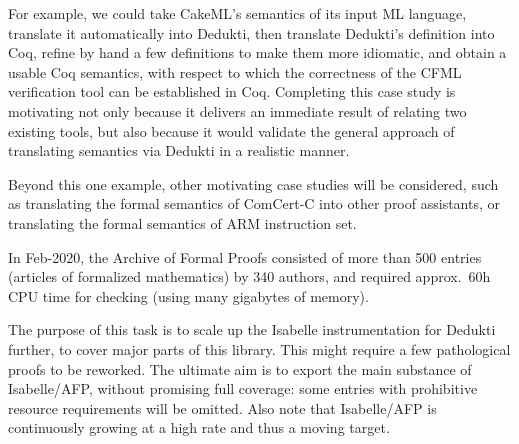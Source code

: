 \begin{workpackage}[id=libraries,wphases=0-48,type=RTD,
  short=Libraries,%
  title=Libraries,
  lead=Inr,
  InrRM=10,
  TumRM=39]
For example, we could take CakeML's semantics of its input ML language,
translate it automatically into Dedukti, then translate Dedukti's
definition into Coq, refine by hand a few definitions to make them more
idiomatic, and obtain a usable Coq semantics, with respect to which
the correctness of the CFML verification tool can be established in Coq.
Completing this case study is motivating not only because it delivers
an immediate result of relating two existing tools, but also because it
would validate the general approach of translating semantics via Dedukti
in a realistic manner.

Beyond this one example, other motivating case studies will be considered,
such as translating the formal semantics of ComCert-C into other proof
assistants, or translating the formal semantics of ARM instruction set.


\begin{tasklist}
\begin{task}[id=mathcomp,title=MathComp]
\end{task}

\begin{task}[id=milc,title=Revised Coq Analysis Library]
\end{task}


\begin{task}[id=afp,title=Isabelle/AFP: The Archive of Formal Proofs]

In Feb-2020, the Archive of Formal Proofs \cite{isabelle-afp}
consisted of more than 500 entries (articles of formalized
mathematics) by 340 authors, and required approx.\ 60h CPU time for
checking (using many gigabytes of memory).

The purpose of this task is to scale up the Isabelle instrumentation
for Dedukti further, to cover major parts of this library.  This might
require a few pathological proofs to be reworked. The ultimate aim is
to export the main substance of Isabelle/AFP, without promising full
coverage: some entries with prohibitive resource requirements will be
omitted. Also note that Isabelle/AFP is continuously growing at a high
rate and thus a moving target.

\end{task}


\end{tasklist}
\end{workpackage}

